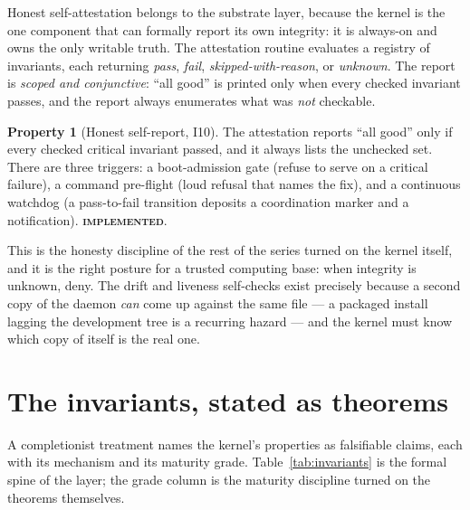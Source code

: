 \documentclass[11pt,a4paper]{article}
\newcommand{\Built}{{\textcolor{hhink}{\textsc{\textbf{implemented}}}}}
\theoremstyle{definition}
\newtheorem{property}{Property}[section]
\theoremstyle{remark}
\begin{document}
Honest self-attestation belongs to the substrate layer, because the kernel is the
one component that can formally report its own integrity: it is always-on and owns
the only writable truth. The attestation routine evaluates a registry of
invariants, each returning \emph{pass}, \emph{fail}, \emph{skipped-with-reason}, or
\emph{unknown}. The report is \emph{scoped and conjunctive}: ``all good'' is printed
only when every checked invariant passes, and the report always enumerates what was
\emph{not} checkable.

\begin{property}[Honest self-report, I10]\label{prop:attest}
The attestation reports ``all good'' only if every checked critical invariant
passed, and it always lists the unchecked set. There are three triggers: a
boot-admission gate (refuse to serve on a critical failure), a command pre-flight
(loud refusal that names the fix), and a continuous watchdog (a pass-to-fail
transition deposits a coordination marker and a notification). \Built.
\end{property}

This is the honesty discipline of the rest of the series turned on the kernel
itself, and it is the right posture for a trusted computing base: when integrity is
unknown, deny. The drift and liveness self-checks exist precisely because a second
copy of the daemon \emph{can} come up against the same file --- a packaged install
lagging the development tree is a recurring hazard --- and the kernel must know
which copy of itself is the real one.

\section{The invariants, stated as theorems}
\label{sec:invariants}

A completionist treatment names the kernel's properties as falsifiable claims, each
with its mechanism and its maturity grade. Table~\ref{tab:invariants} is the formal
spine of the layer; the grade column is the maturity discipline turned on the
theorems themselves.
\end{document}
